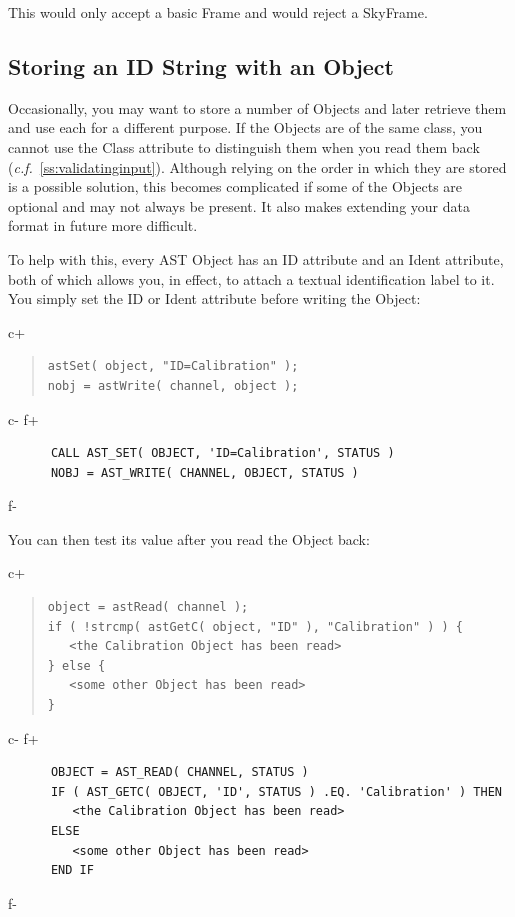 \documentclass[twoside,11pt]{article}
\newcommand{\secref}[1]{\S\ref{#1}}
\renewcommand{\secref}[1]{\ref{#1}}
\begin{document}
This would only accept a basic Frame and would reject a SkyFrame.

\subsection{Storing an ID String with an Object}

Occasionally, you may want to store a number of Objects and later
retrieve them and use each for a different purpose. If the Objects are
of the same class, you cannot use the Class attribute to distinguish
them when you read them back
({\em{c.f.}}~\secref{ss:validatinginput}). Although relying on the
order in which they are stored is a possible solution, this becomes
complicated if some of the Objects are optional and may not always be
present. It also makes extending your data format in future more
difficult.

To help with this, every AST Object has an ID attribute and an Ident
attribute, both of which allows you, in effect, to attach a textual
identification label to it. You simply set the ID or Ident attribute before
writing the Object:

c+
\begin{quote}
\small
\begin{verbatim}
astSet( object, "ID=Calibration" );
nobj = astWrite( channel, object );
\end{verbatim}
\normalsize
\end{quote}
c-
f+
\small
\begin{verbatim}
      CALL AST_SET( OBJECT, 'ID=Calibration', STATUS )
      NOBJ = AST_WRITE( CHANNEL, OBJECT, STATUS )
\end{verbatim}
\normalsize
f-

You can then test its value after you read the Object back:

c+
\begin{quote}
\small
\begin{verbatim}
object = astRead( channel );
if ( !strcmp( astGetC( object, "ID" ), "Calibration" ) ) {
   <the Calibration Object has been read>
} else {
   <some other Object has been read>
}
\end{verbatim}
\normalsize
\end{quote}
c-
f+
\small
\begin{verbatim}
      OBJECT = AST_READ( CHANNEL, STATUS )
      IF ( AST_GETC( OBJECT, 'ID', STATUS ) .EQ. 'Calibration' ) THEN
         <the Calibration Object has been read>
      ELSE
         <some other Object has been read>
      END IF
\end{verbatim}
\normalsize
f-
\end{document}

